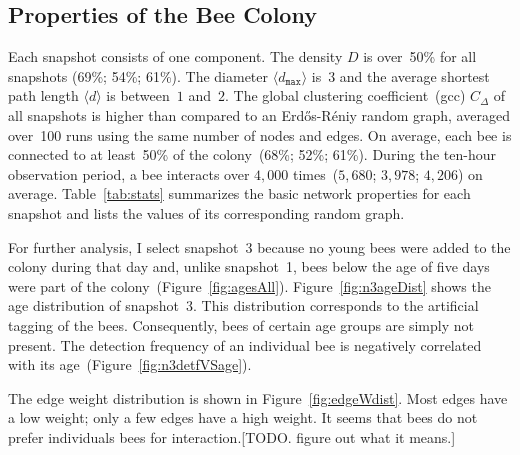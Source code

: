 \subsection{Properties of the Bee Colony}
\label{subsec:colony}
Each snapshot consists of one component.
The density $D$ is over~50\% for all snapshots (69\%; 54\%; 61\%).
The diameter $\langle d_{\texttt{max}} \rangle$ is~$3$ and the average shortest path length $\langle d \rangle$ is between~$1$ and~$2$.
The global clustering coefficient~(gcc) $C_\Delta$ of all snapshots is higher than compared to an Erd\H{o}s-R\'{e}niy random graph, averaged over~100 runs using the same number of nodes and edges.
On average, each bee is connected to at least~50\% of the colony~(68\%; 52\%; 61\%).
During the ten-hour observation period, a bee interacts over $4,000$ times~($5,680$; $3,978$; $4,206$) on average.
Table~\ref{tab:stats} summarizes the basic network properties for each snapshot and lists the values of its corresponding random graph.

For further analysis, I select snapshot~3 because no young bees were added to the colony during that day and, unlike snapshot~1, bees below the age of five days were part of the colony~(Figure~\ref{fig:agesAll}).
Figure~\ref{fig:n3ageDist} shows the age distribution of snapshot~3.
This distribution corresponds to the artificial tagging of the bees.
Consequently, bees of certain age groups are simply not present.
The detection frequency of an individual bee is negatively correlated with its age~(Figure~\ref{fig:n3detfVSage}).


The edge weight distribution is shown in Figure~\ref{fig:edgeWdist}.
Most edges have a low weight; only a few edges have a high weight.
It seems that bees do not prefer individuals bees for interaction.[TODO. figure out what it means.]



